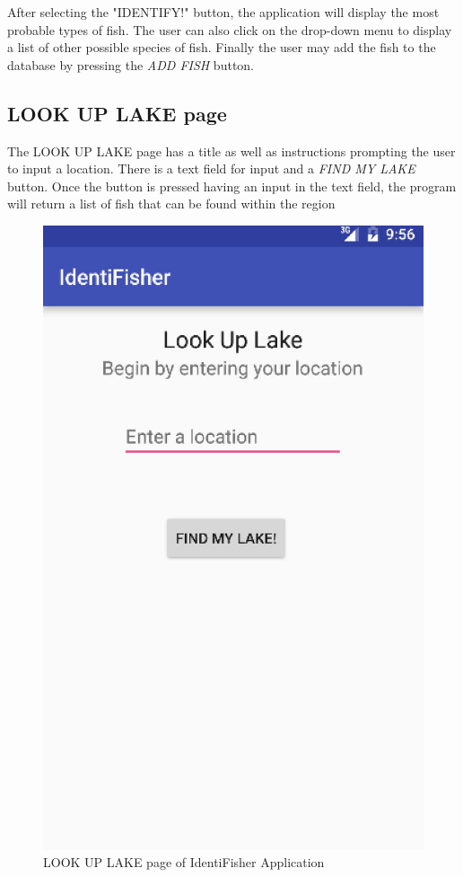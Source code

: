 \documentclass{article}
\begin{document}
After selecting the "IDENTIFY!" button, the application will display the most probable types of fish. The user can also click on the drop-down
menu to display a list of other possible species of fish. Finally the user may add the fish to the database by pressing the \textit{ADD FISH} button.\\

\subsection{LOOK UP LAKE page}
The LOOK UP LAKE page has a title as well as instructions prompting the user to input a location. There is a text field for input and a
\textit{FIND MY LAKE} button. Once the button is pressed having an input in the text field, the program will return a list of fish that can be found within the
region\\
\begin{figure}[H]
	\includegraphics[scale=0.30]{Lookup.png}
	\caption{LOOK UP LAKE page of IdentiFisher Application}
\end{figure}
\end{document}
